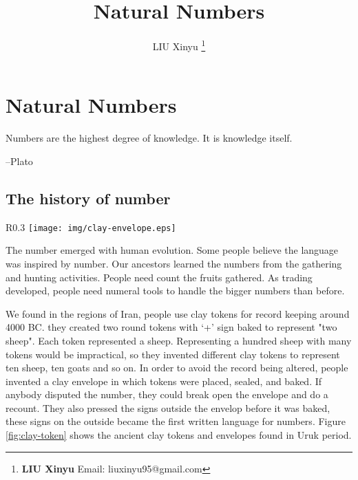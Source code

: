 \documentclass[UTF8]{article}
\begin{document}
\title{Natural Numbers}

\author{LIU Xinyu
\thanks{{\bfseries LIU Xinyu} \newline
  Email: liuxinyu95@gmail.com \newline}
  }

\maketitle
\fi


\ifx\wholebook\relax
\chapter{Natural Numbers}
\fi

\epigraph{Numbers are the highest degree of knowledge. It is knowledge itself.}{--Plato}

\section{The history of number}

\begin{wrapfigure}{R}{0.3\textwidth}
 \centering
 \texttt{[image: img/clay-envelope.eps]}
 \caption{The envelop of tokens in Uruk period from Susa. Louvre Museum}
 \label{fig:clay-token}
\end{wrapfigure}

The number emerged with human evolution. Some people believe the language was inspired by number. Our ancestors learned the numbers from the gathering and hunting activities. People need count the fruits gathered. As trading developed, people need numeral tools to handle the bigger numbers than before.

We found in the regions of Iran, people use clay tokens for record keeping around 4000 BC. they created two round tokens with `+' sign baked to represent "two sheep". Each token represented a sheep. Representing a hundred sheep with many tokens would be impractical, so they invented different clay tokens to represent ten sheep, ten goats and so on. In order to avoid the record being altered, people invented a clay envelope in which tokens were placed, sealed, and baked. If anybody disputed the number, they could break open the envelope and do a recount. They also pressed the signs outside the envelop before it was baked, these signs on the outside became the first written language for numbers\cite{Calvin-Clawson-1994}. Figure \ref{fig:clay-token} shows the ancient clay tokens and envelopes found in Uruk period.
\end{document}
